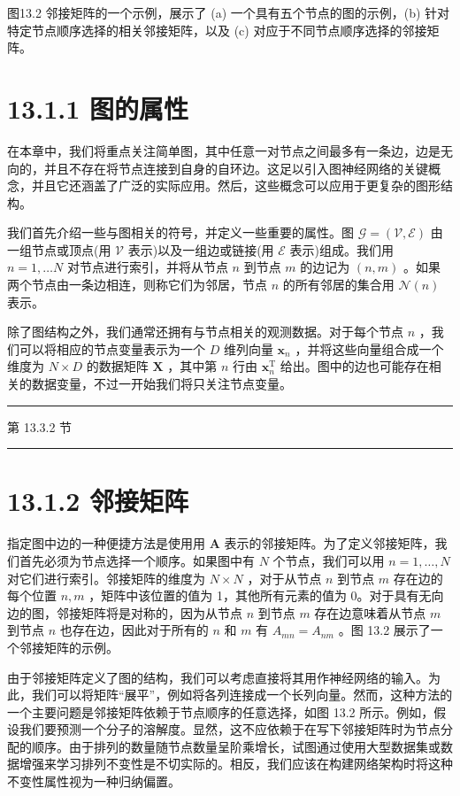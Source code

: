 \documentclass[10pt]{article}
\newcommand{\HRule}{\begin{center}\rule{0.9\linewidth}{0.2mm}\end{center}}
\begin{document}
图13.2 邻接矩阵的一个示例，展示了 (a) 一个具有五个节点的图的示例，(b) 针对特定节点顺序选择的相关邻接矩阵，以及 (c) 对应于不同节点顺序选择的邻接矩阵。

\section*{13.1.1 图的属性}

在本章中，我们将重点关注简单图，其中任意一对节点之间最多有一条边，边是无向的，并且不存在将节点连接到自身的自环边。这足以引入图神经网络的关键概念，并且它还涵盖了广泛的实际应用。然后，这些概念可以应用于更复杂的图形结构。

我们首先介绍一些与图相关的符号，并定义一些重要的属性。图 \(\mathcal{G} = \left( {\mathcal{V},\mathcal{E}}\right)\) 由一组节点或顶点(用 \(\mathcal{V}\) 表示)以及一组边或链接(用 \(\mathcal{E}\) 表示)组成。我们用 \(n = 1,\ldots N\) 对节点进行索引，并将从节点 \(n\) 到节点 \(m\) 的边记为 \(\left( {n,m}\right)\) 。如果两个节点由一条边相连，则称它们为邻居，节点 \(n\) 的所有邻居的集合用 \(\mathcal{N}\left( n\right)\) 表示。

除了图结构之外，我们通常还拥有与节点相关的观测数据。对于每个节点 \(n\) ，我们可以将相应的节点变量表示为一个 \(D\) 维列向量 \({\mathbf{x}}_{n}\) ，并将这些向量组合成一个维度为 \(N \times  D\) 的数据矩阵 \(\mathbf{X}\) ，其中第 \(n\) 行由 \({\mathbf{x}}_{n}^{\mathrm{T}}\) 给出。图中的边也可能存在相关的数据变量，不过一开始我们将只关注节点变量。

\HRule

第 13.3.2 节

\HRule

\section*{13.1.2 邻接矩阵}

指定图中边的一种便捷方法是使用用 \(\mathbf{A}\) 表示的邻接矩阵。为了定义邻接矩阵，我们首先必须为节点选择一个顺序。如果图中有 \(N\) 个节点，我们可以用 \(n = 1,\ldots ,N\) 对它们进行索引。邻接矩阵的维度为 \(N \times  N\) ，对于从节点 \(n\) 到节点 \(m\) 存在边的每个位置 \(n,m\) ，矩阵中该位置的值为 1，其他所有元素的值为 0。对于具有无向边的图，邻接矩阵将是对称的，因为从节点 \(n\) 到节点 \(m\) 存在边意味着从节点 \(m\) 到节点 \(n\) 也存在边，因此对于所有的 \(n\) 和 \(m\) 有 \({A}_{mn} = {A}_{nm}\) 。图 13.2 展示了一个邻接矩阵的示例。

由于邻接矩阵定义了图的结构，我们可以考虑直接将其用作神经网络的输入。为此，我们可以将矩阵“展平”，例如将各列连接成一个长列向量。然而，这种方法的一个主要问题是邻接矩阵依赖于节点顺序的任意选择，如图 13.2 所示。例如，假设我们要预测一个分子的溶解度。显然，这不应依赖于在写下邻接矩阵时为节点分配的顺序。由于排列的数量随节点数量呈阶乘增长，试图通过使用大型数据集或数据增强来学习排列不变性是不切实际的。相反，我们应该在构建网络架构时将这种不变性属性视为一种归纳偏置。
\end{document}

